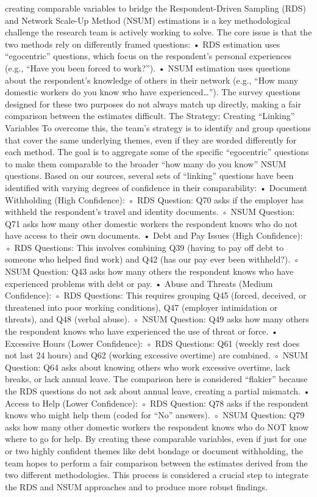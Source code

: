 \documentclass[
  12pt,
  letterpaper,
  DIV=11,
  numbers=noendperiod]{scrartcl}
\theoremstyle{plain}
\theoremstyle{definition}
\begin{document}
creating comparable variables to bridge the Respondent-Driven Sampling
(RDS) and Network Scale-Up Method (NSUM) estimations is a key
methodological challenge the research team is actively working to solve.
The core issue is that the two methods rely on differently framed
questions: • RDS estimation uses ``egocentric'' questions, which focus
on the respondent's personal experiences (e.g., ``Have you been forced
to work?''). • NSUM estimation uses questions about the respondent's
knowledge of others in their network (e.g., ``How many domestic workers
do you know who have experienced\ldots{}''). The survey questions
designed for these two purposes do not always match up directly, making
a fair comparison between the estimates difficult. The Strategy:
Creating ``Linking'' Variables To overcome this, the team's strategy is
to identify and group questions that cover the same underlying themes,
even if they are worded differently for each method. The goal is to
aggregate some of the specific ``egocentric'' questions to make them
comparable to the broader ``how many do you know'' NSUM questions. Based
on our sources, several sets of ``linking'' questions have been
identified with varying degrees of confidence in their comparability: •
Document Withholding (High Confidence): ◦ RDS Question: Q70 asks if the
employer has withheld the respondent's travel and identity documents. ◦
NSUM Question: Q71 asks how many other domestic workers the respondent
knows who do not have access to their own documents. • Debt and Pay
Issues (High Confidence): ◦ RDS Questions: This involves combining Q39
(having to pay off debt to someone who helped find work) and Q42 (has
our pay ever been withheld?). ◦ NSUM Question: Q43 asks how many others
the respondent knows who have experienced problems with debt or pay. •
Abuse and Threats (Medium Confidence): ◦ RDS Questions: This requires
grouping Q45 (forced, deceived, or threatened into poor working
conditions), Q47 (employer intimidation or threats), and Q48 (verbal
abuse). ◦ NSUM Question: Q49 asks how many others the respondent knows
who have experienced the use of threat or force. • Excessive Hours
(Lower Confidence): ◦ RDS Questions: Q61 (weekly rest does not last 24
hours) and Q62 (working excessive overtime) are combined. ◦ NSUM
Question: Q64 asks about knowing others who work excessive overtime,
lack breaks, or lack annual leave. The comparison here is considered
``flakier'' because the RDS questions do not ask about annual leave,
creating a partial mismatch. • Access to Help (Lower Confidence): ◦ RDS
Question: Q78 asks if the respondent knows who might help them (coded
for ``No'' answers). ◦ NSUM Question: Q79 asks how many other domestic
workers the respondent knows who do NOT know where to go for help. By
creating these comparable variables, even if just for one or two highly
confident themes like debt bondage or document withholding, the team
hopes to perform a fair comparison between the estimates derived from
the two different methodologies. This process is considered a crucial
step to integrate the RDS and NSUM approaches and to produce more robust
findings.
\end{document}
